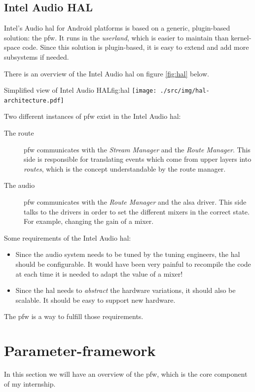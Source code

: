 \subsection{Intel Audio HAL}
Intel's Audio \gls{hal} for Android platforms is based on a generic, plugin-based solution: the \gls{pfw}.
It runs in the \emph{userland}, which is easier to maintain than kernel-space code.
Since this solution is plugin-based, it is easy to extend and add more subsystems if needed.

There is an overview of the Intel Audio \gls{hal} on figure \ref{fig:hal} below.
\begin{figureGraphics}{Simplified view of Intel Audio HAL}{fig:hal}
    \texttt{[image: ./src/img/hal-architecture.pdf]}
\end{figureGraphics}
Two different instances of \gls{pfw} exist in the Intel Audio \gls{hal}:
\begin{description}
    \item[The route] \gls{pfw} communicates with the \emph{Stream Manager} and the \emph{Route Manager}.
        This side is responsible for translating events which come from upper layers into \emph{routes}, which
        is the concept understandable by the route manager.
    \item[The audio] \gls{pfw} communicates with the \emph{Route Manager} and the \gls{alsa} driver.
        This side talks to the drivers in order to set the different mixers in the correct state. For example,
        changing the gain of a mixer.
\end{description}

Some requirements of the Intel Audio \gls{hal}:
\begin{itemize}
    \item Since the audio system needs to be tuned by the tuning engineers, the \gls{hal} should be configurable.
        It would have been very painful to recompile the code at each time it is needed to adapt the value of a mixer!
    \item Since the \gls{hal} needs to \emph{abstract} the hardware variations, it should also be scalable. It should be
        easy to support new hardware.
\end{itemize}

The \gls{pfw} is a way to fulfill those requirements.


\section{Parameter-framework}
\label{sec:parameter-framework}
In this section we will have an overview of the \gls{pfw}, which is the core component of my internship.

